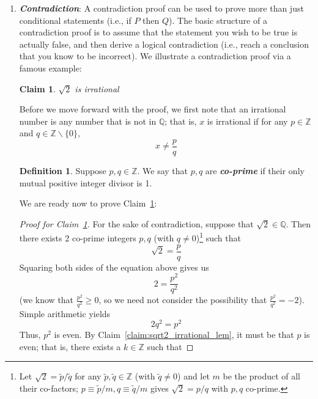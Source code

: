 \documentclass{article}
\newcommand{\Q}{\mathbb{Q}}
\newcommand{\Z}{\mathbb{Z}}
\newcommand{\keyword}[1]{\textit{\textbf{#1}}\index{#1}}
\newtheorem{claim}{Claim}
\theoremstyle{definition}
\newtheorem{definition}{Definition}
\begin{document}
\begin{enumerate}
    \item \keyword{Contradiction}: A contradiction proof can be used to prove more than just conditional statements (i.e., if $P$ then $Q$). The basic structure of a contradiction proof is to assume that the statement you wish to be true is actually false, and then derive a logical contradiction (i.e., reach a conclusion that you know to be incorrect). We illustrate a contradiction proof via a famous example:
    \begin{claim}\label{claim:sqrt2_irrational}
        $\sqrt{2}$ is irrational
    \end{claim}
    Before we move forward with the proof, we first note that an irrational number is any number that is not in $\Q$; that is, $x$ is irrational if for any $p\in \Z$ and $q\in \Z \backslash \{0\}$, 
    \begin{equation*}
        x \neq \frac{p}{q}
    \end{equation*}
    \begin{definition}\label{def:co-prime}
        Suppose $p,q\in \Z$. We say that $p,q$ are \keyword{co-prime} if their only mutual positive integer divisor is 1.  
    \end{definition}
    We are ready now to prove Claim~\ref{claim:sqrt2_irrational}:
    \begin{proof}[Proof for Claim~\ref{claim:sqrt2_irrational}]
        For the sake of contradiction, suppose that $\sqrt{2}\in \Q$. Then there exists 2 co-prime integers $p,q$ (with $q\neq 0$)\footnote{Let $\sqrt{2} = \widetilde{p} / \widetilde{q}$ for any $\widetilde{p}, \widetilde{q}\in \Z$ (with $\widetilde{q}\neq 0$) and let $m$ be the product of all their co-factors; $p \equiv \widetilde{p} / m, q \equiv \widetilde{q} / m$ gives $\sqrt{2} = p / q$ with $p, q$ co-prime.} such that 
        \begin{equation*}
            \sqrt{2} = \frac{p}{q}
        \end{equation*}
        Squaring both sides of the equation above gives us
        \begin{equation*}
            2 = \frac{p^2}{q^2}
        \end{equation*}
        (we know that $\frac{p^2}{q^2} \geq 0$, so we need not consider the possibility that $\frac{p^2}{q^2} = -2$). Simple arithmetic yields
        \begin{equation}\label{eq:sqrt(2)_irrational_eq}
            2q^2 = p^2
        \end{equation}
        Thus, $p^2$ is even. By Claim~\ref{claim:sqrt2_irrational_lem}, it must be that $p$ is even; that is, there exists a $k\in\Z$ such that 

\end{proof}
\end{enumerate}
\end{document}
